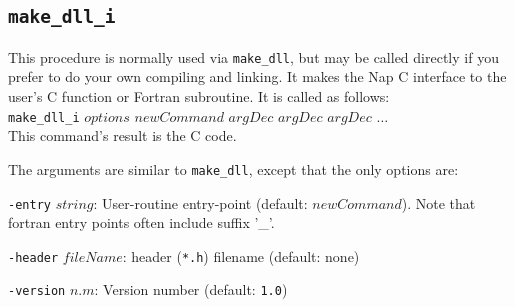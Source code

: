 \subsection{\texttt{make\_dll\_i}}
    \label{make-dll-make-dll-i}

This procedure is normally used via 
\texttt{make\_dll}, but may be called directly if you prefer to do your own compiling and linking.
It makes the Nap C interface to the user's C function or Fortran subroutine.
It is called as follows:
\\
\texttt{make\_dll\_i}
$\mathit{options}$
$\mathit{newCommand}$
$\mathit{argDec}$
$\mathit{argDec}$
$\mathit{argDec}$
$\ldots$
\\
This command's result is the C code.

The arguments are similar to 
  \texttt{make\_dll}, except that the only options are:
\begin{simpleitems}
  \item \texttt{-entry} $\mathit{string}$: User-routine entry-point (default: 
      $\mathit{newCommand}$). Note that fortran entry points often include suffix '\_'.
  \item \texttt{-header} $\mathit{fileName}$: header (\texttt{*.h}) filename (default: none)
  \item \texttt{-version} $\mathit{n.m}$: Version number (default: \texttt{1.0})
\end{simpleitems}
